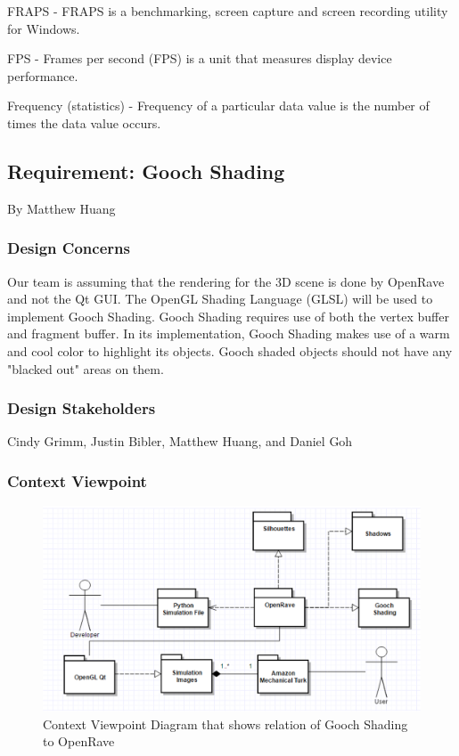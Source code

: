 \begin{flushleft}
FRAPS - FRAPS is a benchmarking, screen capture and screen recording utility for Windows.

FPS - Frames per second (FPS) is a unit that measures display device performance.

Frequency (statistics) - Frequency of a particular data value is the number of times the data value occurs. \cite{freq}

\newpage

\subsection{Requirement: Gooch Shading}
\large{By Matthew Huang}

\normalsize
\subsubsection{Design Concerns}
Our team is assuming that the rendering for the 3D scene is done by OpenRave and not the Qt GUI.
The OpenGL Shading Language (GLSL) will be used to implement Gooch Shading. 
Gooch Shading requires use of both the vertex buffer and fragment buffer.
In its implementation, Gooch Shading makes use of a warm and cool color to highlight its objects.
Gooch shaded objects should not have any "blacked out" areas on them.

\subsubsection{Design Stakeholders}
Cindy Grimm, Justin Bibler, Matthew Huang, and Daniel Goh

\subsubsection{Context Viewpoint}

\begin{figure} [H]
  \includegraphics[scale=0.8]{designdoc_v1/Gooch_Shading_context.eps}
  \caption
{ \newline \hspace{\linewidth}
Context Viewpoint Diagram that shows relation of Gooch Shading to OpenRave}
  \label{fig:Gooch_Shading_context}
\end{figure}


\end{flushleft}
